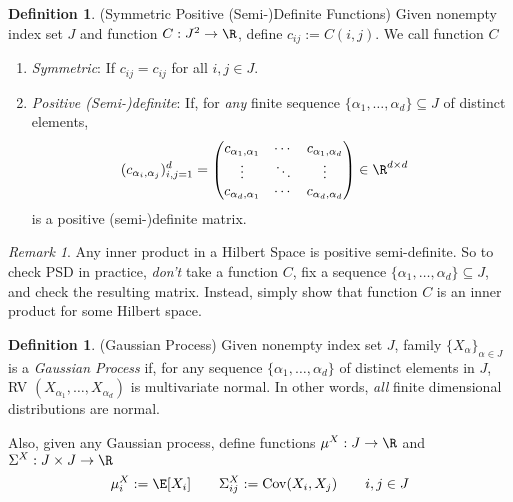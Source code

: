 \documentclass[12pt]{article}
\theoremstyle{plain}
\theoremstyle{definition}
\newtheorem{defn}[thm]{Definition}
\theoremstyle{remark}
\newtheorem*{rmk}{Remark}
\newcommand{\ra}{\rightarrow}
\newcommand{\Cov}{\operatorname{Cov}}
\begin{document}
\begin{defn}
\label{defn:psd}
(Symmetric Positive (Semi-)Definite Functions)
Given nonempty index set $J$ and function $C:J^2 \ra \R$,
define $c_{ij}:=C(i,j)$. We call function $C$
\begin{enumerate}
  \item \emph{Symmetric}: If $c_{ij}=c_{ij}$ for all $i,j \in J$.
  \item \emph{Positive (Semi-)definite}: If,
    for \emph{any} finite sequence
    $\{\alpha_1,\ldots,\alpha_d\}\subseteq J$ of distinct elements,
    \begin{align*}
      (c_{\alpha_i,\alpha_j})^d_{i,j=1}
      &=
      \begin{pmatrix}
        c_{\alpha_1,\alpha_1} &\cdots & c_{\alpha_1,\alpha_d} \\
        \vdots &\ddots & \vdots \\
        c_{\alpha_d,\alpha_1} &\cdots & c_{\alpha_d,\alpha_d} \\
      \end{pmatrix}
      \in \R^{d\times d}
    \end{align*}
    is a positive (semi-)definite matrix.
\end{enumerate}
\end{defn}
\begin{rmk}
Any inner product in a Hilbert Space is positive semi-definite. So to
check PSD in practice, \emph{don't} take a function $C$, fix a sequence
$\{\alpha_1,\ldots,\alpha_d\}\subseteq J$, and check the resulting
matrix.
Instead, simply show that function $C$ is an inner product for some
Hilbert space.
\end{rmk}

\begin{defn}(Gaussian Process)
Given nonempty index set $J$, family $\{X_\alpha\}_{\alpha\in J}$
is a \emph{Gaussian Process} if, for any sequence $\{\alpha_1,\ldots,\alpha_d\}$
of distinct elements in $J$,
RV $(X_{\alpha_1},\ldots,X_{\alpha_d})$ is multivariate normal.
In other words, \emph{all} finite dimensional distributions are normal.

Also, given any Gaussian process, define functions
$\mu^X:J\ra \R$ and $\Sigma^X:J\times J \ra \R$
\begin{align}
  \mu_i^X := \E[X_i]
  \qquad
  \Sigma_{ij}^X := \Cov(X_i,X_j)
  \qquad i,j\in J
  \label{gaussianfunctions}
\end{align}
\end{defn}
\end{document}
